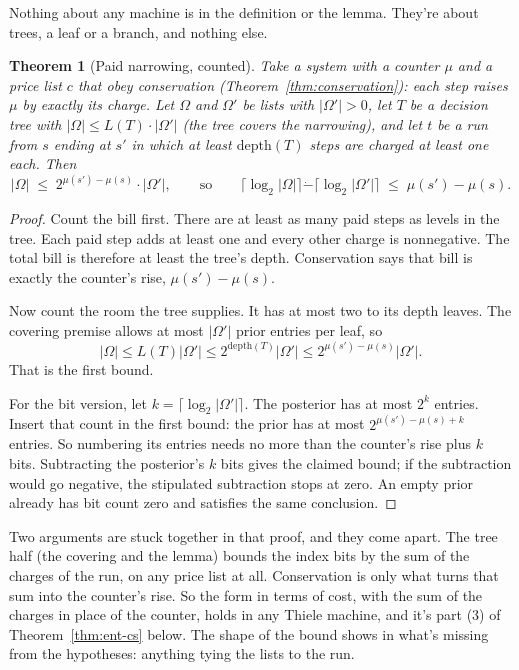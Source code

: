 \documentclass[11pt,twoside]{article}
\theoremstyle{thielethm}
\newtheorem{theorem}{Theorem}[section]
\theoremstyle{thieledef}
\theoremstyle{thieledef}
\theoremstyle{thieledef}
\theoremstyle{thielethm}
\theoremstyle{thieleobs}
\theoremstyle{thielethm}
\begin{document}
Nothing about any machine is in the definition or the lemma. They're about trees, a leaf or a
branch, and nothing else.

\begin{theorem}[Paid narrowing, counted]\label{thm:u08-count}
Take a system with a counter $\mu$ and a price list $c$ that obey conservation
(Theorem~\ref{thm:conservation}): each step raises $\mu$ by exactly its charge. Let $\Omega$ and
$\Omega'$ be lists with $|\Omega'| > 0$, let $T$ be a decision tree with
$|\Omega| \le L(T) \cdot |\Omega'|$ (the tree \emph{covers} the narrowing), and let $t$ be a run from
$s$ ending at $s'$ in which at least $\mathrm{depth}(T)$ steps are charged at least one each.
Then
\[
|\Omega| \;\le\; 2^{\mu(s') - \mu(s)} \cdot |\Omega'|, \qquad\text{so}\qquad \lceil \log_2 |\Omega| \rceil \mathbin{\dot{-}} \lceil \log_2 |\Omega'| \rceil \;\le\; \mu(s') - \mu(s). \] \end{theorem}

\begin{proof}
Count the bill first. There are at least as many paid steps as levels in the
tree. Each paid step adds at least one and every other charge is nonnegative.
The total bill is therefore at least the tree's depth. Conservation says
that bill is exactly the counter's rise, $\mu(s')-\mu(s)$.

Now count the room the tree supplies. It has at most two to its depth leaves.
The covering premise allows at most $|\Omega'|$ prior entries per leaf, so
\[
|\Omega|\le L(T)|\Omega'|
 \le 2^{\mathrm{depth}(T)}|\Omega'|
 \le 2^{\mu(s')-\mu(s)}|\Omega'|.
\]
That is the first bound.

For the bit version, let $k=\lceil\log_2|\Omega'|\rceil$.
The posterior has at most $2^k$ entries. Insert that count in the first bound:
the prior has at most $2^{\mu(s')-\mu(s)+k}$ entries. So numbering its entries
needs no more than the counter's rise plus $k$ bits. Subtracting the posterior's
$k$ bits gives the claimed bound; if the subtraction would go negative, the
stipulated subtraction stops at zero. An empty prior already has bit count
zero and satisfies the same conclusion.
\end{proof}

Two arguments are stuck together in that proof, and they come apart. The tree half (the
covering and the lemma) bounds the index bits by the sum of the charges of the run, on any price
list at all. Conservation is only what turns that sum into the counter's rise. So the form in terms of cost,
with the sum of the charges in place of the counter, holds in any Thiele machine, and it's
part (3) of Theorem~\ref{thm:ent-cs} below. The shape of the bound shows in what's missing from
the hypotheses: anything tying the lists to the run.
\end{document}
